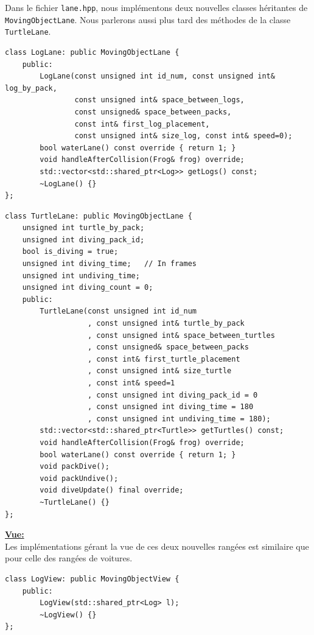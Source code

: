 \documentclass[a4paper, 12pt]{article}
\begin{document}
Dans le fichier \texttt{lane.hpp}, nous implémentons deux nouvelles classes héritantes de \texttt{MovingObjectLane}. 
Nous parlerons aussi plus tard des méthodes de la classe \texttt{TurtleLane}. \\

\begin{lstlisting}
class LogLane: public MovingObjectLane {
    public:
        LogLane(const unsigned int id_num, const unsigned int& log_by_pack,
                const unsigned int& space_between_logs,
                const unsigned& space_between_packs,
                const int& first_log_placement,
                const unsigned int& size_log, const int& speed=0);
        bool waterLane() const override { return 1; }
        void handleAfterCollision(Frog& frog) override;
        std::vector<std::shared_ptr<Log>> getLogs() const;
        ~LogLane() {}
};
\end{lstlisting}

\begin{lstlisting}
class TurtleLane: public MovingObjectLane {
    unsigned int turtle_by_pack;
    unsigned int diving_pack_id;
    bool is_diving = true;
    unsigned int diving_time;   // In frames
    unsigned int undiving_time;
    unsigned int diving_count = 0;
    public:
        TurtleLane(const unsigned int id_num
                   , const unsigned int& turtle_by_pack
                   , const unsigned int& space_between_turtles
                   , const unsigned& space_between_packs
                   , const int& first_turtle_placement
                   , const unsigned int& size_turtle
                   , const int& speed=1
                   , const unsigned int diving_pack_id = 0
                   , const unsigned int diving_time = 180
                   , const unsigned int undiving_time = 180);
        std::vector<std::shared_ptr<Turtle>> getTurtles() const;
        void handleAfterCollision(Frog& frog) override;
        bool waterLane() const override { return 1; }
        void packDive();
        void packUndive();
        void diveUpdate() final override;
        ~TurtleLane() {}
};
\end{lstlisting} \hspace{0.5cm}


\underline{\textbf{Vue:}} \\
Les implémentations gérant la vue de ces deux nouvelles rangées est similaire que pour celle des rangées de voitures. \\
\begin{lstlisting}
class LogView: public MovingObjectView {
    public:
        LogView(std::shared_ptr<Log> l);
        ~LogView() {}
};
\end{lstlisting}
\end{document}
